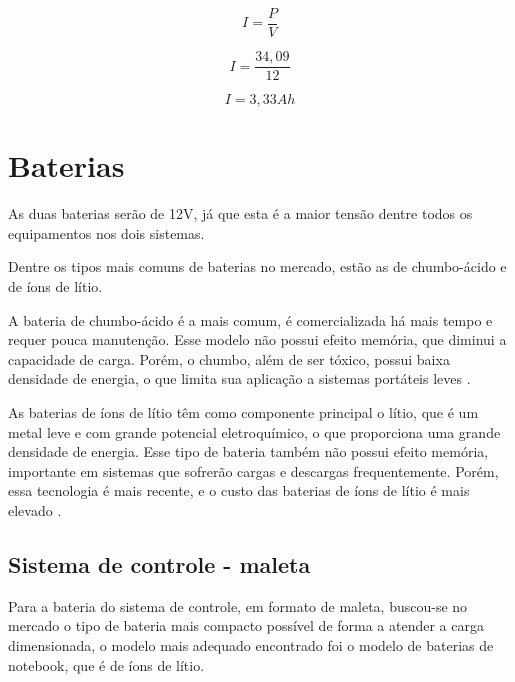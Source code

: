 \begin{equation}
   I =  \frac{P}{V}
   \end{equation}
   
   \begin{equation}
      I =  \frac{34,09}{12}
   \end{equation}
   
  \begin{equation}   
   I = 3,33 Ah
 \end{equation}

\section{Baterias}
\label{sec:baterias}

\par As duas baterias serão de 12V, já que esta é a maior tensão dentre todos os equipamentos nos dois sistemas.

\par Dentre os tipos mais comuns de baterias no mercado, estão as de chumbo-ácido e de íons de lítio. 

\par A bateria de chumbo-ácido é a mais comum, é comercializada há mais tempo e requer pouca manutenção. Esse modelo não possui efeito memória, que diminui a capacidade de carga. Porém, o chumbo, além de ser tóxico, possui baixa densidade de energia,  o que limita sua aplicação a sistemas portáteis leves \cite{baterias}.

\par As baterias de íons de lítio têm como componente principal o lítio, que é um metal leve e com grande potencial eletroquímico, o que proporciona uma grande densidade de energia. Esse tipo de bateria também não possui efeito memória, importante em sistemas que sofrerão cargas e descargas frequentemente. Porém, essa tecnologia é mais recente, e o custo das baterias de íons de lítio é mais elevado \cite{baterias}. 

\subsection{Sistema de controle - maleta} 

\par Para a bateria do sistema de controle, em formato de maleta, buscou-se no mercado o tipo de bateria mais compacto possível de forma a atender a carga dimensionada, o modelo mais adequado encontrado foi o modelo de baterias de notebook, que é de íons de lítio. 

